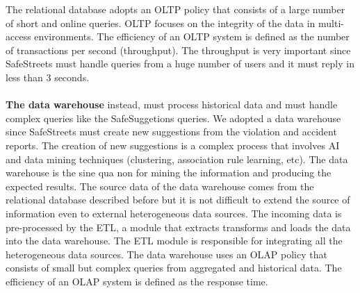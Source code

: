 \documentclass[./main.tex]{subfiles}
\begin{document}
The relational database adopts an OLTP policy that consists of a large number of short and online queries.  OLTP focuses on the integrity of the data in multi-access environments. The efficiency of an OLTP system is defined as the number of transactions per second (throughput). The throughput is very important since SafeStreets must handle queries from a huge number of users and it must reply in less than 3 seconds.
\\\\
\textbf{The data warehouse} instead, must process historical data and must handle complex queries like the SafeSuggetions queries. We adopted a data warehouse since SafeStreets must create new suggestions from the violation and accident reports. The creation of new suggestions is a complex process that involves AI and data mining techniques (clustering, association rule learning, etc). The data warehouse is the sine qua non for mining the information and producing the expected results. The source data of the data warehouse comes from the relational database described before but it is not difficult to extend the source of information even to external heterogeneous data sources. The incoming data is pre-processed by the ETL, a module that extracts transforms and loads the data into the data warehouse. The ETL module is responsible for integrating all the heterogeneous data sources. The data warehouse uses an OLAP policy that consists of small but complex queries from aggregated and historical data. The efficiency of an OLAP system is defined as the response time.
\end{document}
